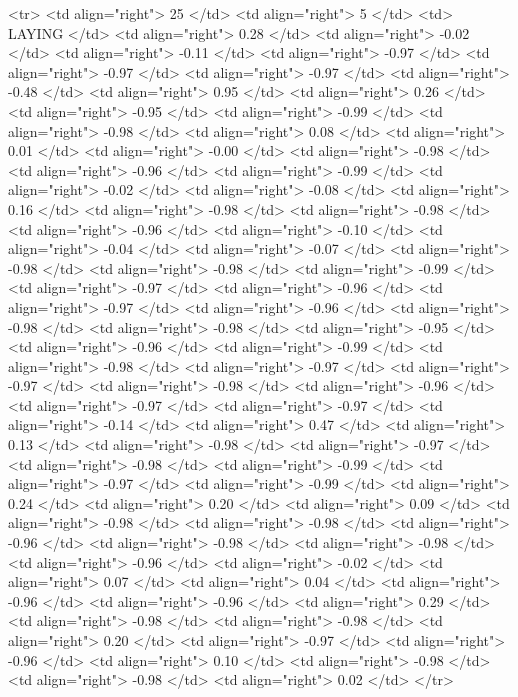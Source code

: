   <tr> <td align="right"> 25 </td> <td align="right">   5 </td> <td> LAYING </td> <td align="right"> 0.28 </td> <td align="right"> -0.02 </td> <td align="right"> -0.11 </td> <td align="right"> -0.97 </td> <td align="right"> -0.97 </td> <td align="right"> -0.97 </td> <td align="right"> -0.48 </td> <td align="right"> 0.95 </td> <td align="right"> 0.26 </td> <td align="right"> -0.95 </td> <td align="right"> -0.99 </td> <td align="right"> -0.98 </td> <td align="right"> 0.08 </td> <td align="right"> 0.01 </td> <td align="right"> -0.00 </td> <td align="right"> -0.98 </td> <td align="right"> -0.96 </td> <td align="right"> -0.99 </td> <td align="right"> -0.02 </td> <td align="right"> -0.08 </td> <td align="right"> 0.16 </td> <td align="right"> -0.98 </td> <td align="right"> -0.98 </td> <td align="right"> -0.96 </td> <td align="right"> -0.10 </td> <td align="right"> -0.04 </td> <td align="right"> -0.07 </td> <td align="right"> -0.98 </td> <td align="right"> -0.98 </td> <td align="right"> -0.99 </td> <td align="right"> -0.97 </td> <td align="right"> -0.96 </td> <td align="right"> -0.97 </td> <td align="right"> -0.96 </td> <td align="right"> -0.98 </td> <td align="right"> -0.98 </td> <td align="right"> -0.95 </td> <td align="right"> -0.96 </td> <td align="right"> -0.99 </td> <td align="right"> -0.98 </td> <td align="right"> -0.97 </td> <td align="right"> -0.97 </td> <td align="right"> -0.98 </td> <td align="right"> -0.96 </td> <td align="right"> -0.97 </td> <td align="right"> -0.97 </td> <td align="right"> -0.14 </td> <td align="right"> 0.47 </td> <td align="right"> 0.13 </td> <td align="right"> -0.98 </td> <td align="right"> -0.97 </td> <td align="right"> -0.98 </td> <td align="right"> -0.99 </td> <td align="right"> -0.97 </td> <td align="right"> -0.99 </td> <td align="right"> 0.24 </td> <td align="right"> 0.20 </td> <td align="right"> 0.09 </td> <td align="right"> -0.98 </td> <td align="right"> -0.98 </td> <td align="right"> -0.96 </td> <td align="right"> -0.98 </td> <td align="right"> -0.98 </td> <td align="right"> -0.96 </td> <td align="right"> -0.02 </td> <td align="right"> 0.07 </td> <td align="right"> 0.04 </td> <td align="right"> -0.96 </td> <td align="right"> -0.96 </td> <td align="right"> 0.29 </td> <td align="right"> -0.98 </td> <td align="right"> -0.98 </td> <td align="right"> 0.20 </td> <td align="right"> -0.97 </td> <td align="right"> -0.96 </td> <td align="right"> 0.10 </td> <td align="right"> -0.98 </td> <td align="right"> -0.98 </td> <td align="right"> 0.02 </td> </tr>
